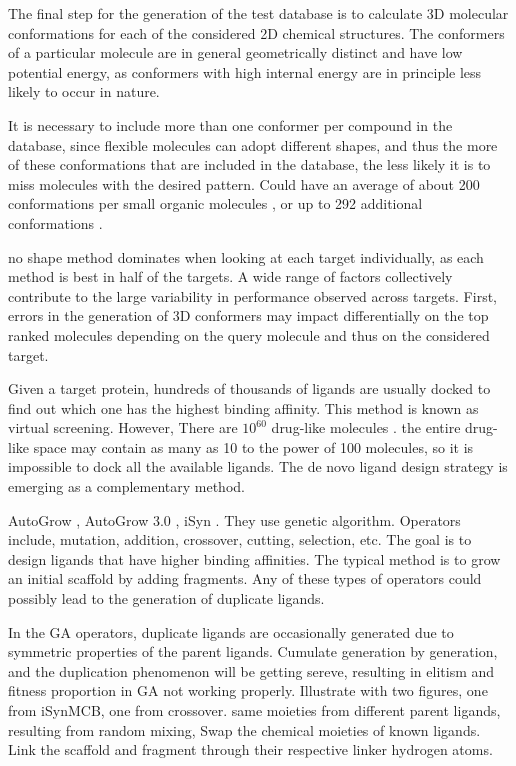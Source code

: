 \documentclass[twocolumn]{svjour3}          %
\begin{document}
The final step for the generation of the test database is to calculate 3D molecular conformations for each of the considered 2D chemical structures. The conformers of a particular molecule are in general geometrically distinct and have low potential energy, as conformers with high internal energy are in principle less likely to occur in nature.

It is necessary to include more than one conformer per compound in the database, since flexible molecules can adopt different shapes, and thus the more of these conformations that are included in the database, the less likely it is to miss molecules with the desired pattern. Could have an average of about 200 conformations per small organic molecules \cite{1332}, or up to 292 additional conformations \cite{1280}.

\cite{1332} no shape method dominates when looking at each target individually, as each method is best in half of the targets. A wide range of factors collectively contribute to the large variability in performance observed across targets. First, errors in the generation of 3D conformers may impact differentially on the top ranked molecules depending on the query molecule and thus on the considered target.


Given a target protein, hundreds of thousands of ligands are usually docked to find out which one has the highest binding affinity. This method is known as virtual screening. However, There are $10^{60}$ drug-like molecules \cite{1104}. the entire drug-like space may contain as many as 10 to the power of 100 molecules, so it is impossible to dock all the available ligands. The de novo ligand design strategy is emerging as a complementary method.

AutoGrow \cite{466}, AutoGrow 3.0 \cite{1354}, iSyn \cite{1381,1387}. They use genetic algorithm. Operators include, mutation, addition, crossover, cutting, selection, etc. The goal is to design ligands that have higher binding affinities. The typical method is to grow an initial scaffold by adding fragments. Any of these types of operators could possibly lead to the generation of duplicate ligands.

In the GA operators, duplicate ligands are occasionally generated due to symmetric properties of the parent ligands. Cumulate generation by generation, and the duplication phenomenon will be getting sereve, resulting in elitism and fitness proportion in GA not working properly. Illustrate with two figures, one from iSynMCB, one from crossover. same moieties from different parent ligands, resulting from random mixing, Swap the chemical moieties of known ligands. Link the scaffold and fragment through their respective linker hydrogen atoms.
\end{document}
